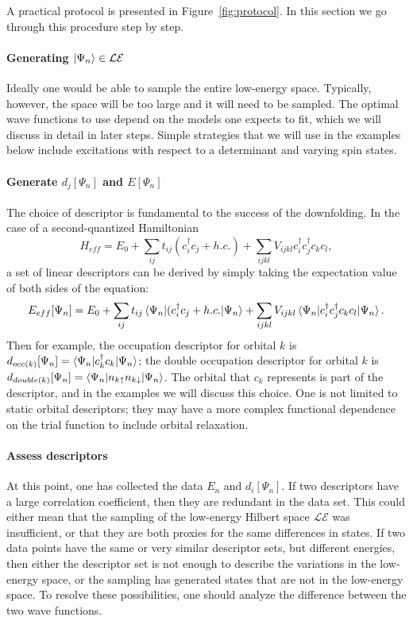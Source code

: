 A practical protocol is presented in Figure~\ref{fig:protocol}. 
In this section we go through this procedure step by step.

\paragraph{Generating $\ket{\Psi_n}\in \mathcal{LE}$}
Ideally one would be able to sample the entire low-energy space. 
Typically, however, the space will be too large and it will need to be sampled. 
The optimal wave functions to use depend on the models one expects to fit, which we will discuss in detail  in later steps. 
Simple strategies that we will use in the examples below include excitations with respect to a determinant and varying spin states.


\paragraph{Generate $d_j[\Psi_n]$ and $E[\Psi_n]$} 
The choice of descriptor is fundamental to the success of the downfolding. 
In the case of a second-quantized Hamiltonian
\begin{equation}\label{eq:Heff_ansatz}
H_{eff} = E_0 + \sum_{ij} t_{ij} (c_i^\dagger c_j + h.c.) + \sum_{ijkl} V_{ijkl} c_i^\dagger c_j^\dagger c_k c_l,
\end{equation}
a set of linear descriptors can be derived by simply taking the expectation value of both sides of the equation:
\begin{equation}
E_{eff}[\Psi_n] = E_0 + 
\sum_{ij} t_{ij} \braket{\Psi_n|(c_i^\dagger c_j + h.c.|\Psi_n}+ 
\sum_{ijkl} V_{ijkl} \braket{\Psi_n | c_i^\dagger c_j^\dagger c_k c_l|\Psi_n}.
\label{eqn:effh}
\end{equation}
Then for example, the occupation descriptor for orbital $k$ is $d_{occ(k)}[\Psi_n] = \braket{\Psi_n| c_k^\dagger c_k | \Psi_n}$; the double occupation descriptor for orbital $k$ is $d_{double(k)}[\Psi_n] = \braket{\Psi_n | n_{k\uparrow}n_{k\downarrow} | \Psi_n}$. 
The orbital that $c_k$ represents is part of the descriptor, and in the examples we will discuss this choice.
One is not limited to static orbital descriptors; they may have a more complex functional dependence on the trial function to include orbital relaxation.

 
\paragraph{Assess descriptors}
At this point, one has collected the data $E_n$ and $d_{i}[\Psi_n]$. 
If two descriptors have a large correlation coefficient, then they are redundant in the data set. 
This could either mean that the sampling of the low-energy Hilbert space $\mathcal{LE}$ was insufficient, or that they are both proxies for the same differences in states. 
If two data points have the same or very similar descriptor sets, but different energies, then either the descriptor set is not enough to describe the variations in the low-energy space, or the sampling has generated states that are not in the low-energy space.
To resolve these possibilities, one should analyze the difference between the two wave functions.  

